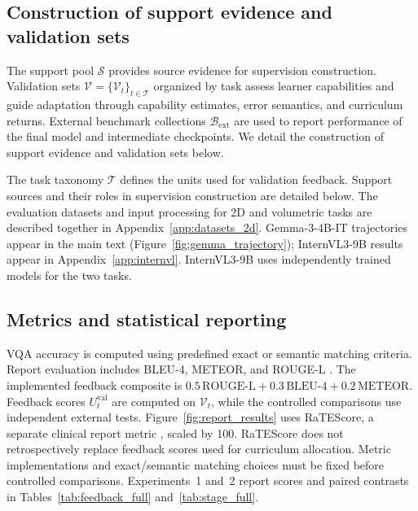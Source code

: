 \paragraph{}



\subsection{Construction of support evidence and validation sets}

The support pool $\mathcal S$ provides source evidence for supervision construction. Validation sets $\mathcal V=\{\mathcal V_t\}_{t\in\mathcal T}$ organized by task assess learner capabilities and guide adaptation through capability estimates, error semantics, and curriculum returns. External benchmark collections $\mathcal B_{\mathrm{ext}}$ are used to report performance of the final model and intermediate checkpoints. We detail the construction of support evidence and validation sets below.

The task taxonomy $\mathcal T$ defines the units used for validation feedback. Support sources and their roles in supervision construction are detailed below. The evaluation datasets and input processing for 2D and volumetric tasks are described together in Appendix~\ref{app:datasets_2d}. Gemma-3-4B-IT trajectories appear in the main text (Figure~\ref{fig:gemma_trajectory}); InternVL3-9B results appear in Appendix~\ref{app:internvl}. InternVL3-9B uses independently trained models for the two tasks.





\subsection{Metrics and statistical reporting}

VQA accuracy is computed using predefined exact or semantic matching criteria. Report evaluation includes BLEU-4, METEOR, and ROUGE-L \citep{papineni2002bleu,banerjee2005meteor,lin2004rouge}. The implemented feedback composite is
$0.5\,\mathrm{ROUGE\mbox{-}L}+0.3\,\mathrm{BLEU\mbox{-}4}+0.2\,\mathrm{METEOR}$.
Feedback scores $U_t^{\mathrm{val}}$ are computed on $\mathcal V_t$, while the controlled comparisons use independent external tests. Figure~\ref{fig:report_results} uses RaTEScore, a separate clinical report metric \citep{zhao2024ratescore}, scaled by 100. RaTEScore does not retrospectively replace feedback scores used for curriculum allocation. Metric implementations and exact/semantic matching choices must be fixed before controlled comparisons. Experiments~1 and~2 report scores and paired contrasts in Tables~\ref{tab:feedback_full} and~\ref{tab:stage_full}.

